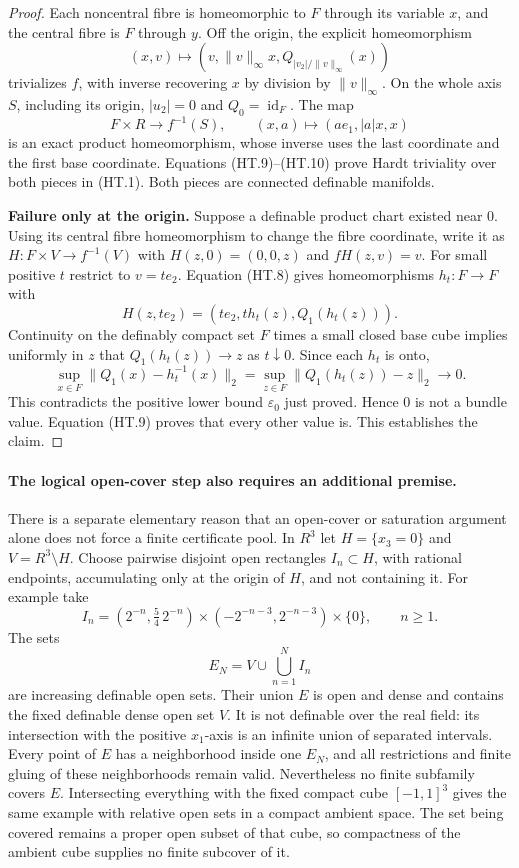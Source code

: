 \begin{proof}
Each noncentral fibre is homeomorphic to $F$ through its variable $x$,
and the central fibre is $F$ through $y$. Off the origin, the explicit
homeomorphism
\[
 (x,v)\longmapsto(v,\|v\|_\infty x,Q_{|v_2|/\|v\|_\infty}(x))
\tag{HT.9}
\]
trivializes $f$, with inverse recovering $x$ by division by
$\|v\|_\infty$. On the whole axis $S$, including its origin,
$|u_2|=0$ and $Q_0=\operatorname{id}_F$. The map
\[
 F\times R\longrightarrow f^{-1}(S),\qquad
 (x,a)\longmapsto(ae_1,|a|x,x)
\tag{HT.10}
\]
is an exact product homeomorphism, whose inverse uses the last
coordinate and the first base coordinate. Equations (HT.9)--(HT.10)
prove Hardt triviality over both pieces in (HT.1). Both pieces are
connected definable manifolds.

\textbf{Failure only at the origin.}\quad
Suppose a definable product chart existed near $0$. Using its central
fibre homeomorphism to change the fibre coordinate, write it as
$H:F\times V\to f^{-1}(V)$ with
$H(z,0)=(0,0,z)$ and $fH(z,v)=v$. For small positive $t$ restrict
to $v=te_2$. Equation (HT.8) gives homeomorphisms $h_t:F\to F$
with
\[
 H(z,te_2)=(te_2,t h_t(z),Q_1(h_t(z))).
\tag{HT.11}
\]
Continuity on the definably compact set $F$ times a small closed base
cube implies uniformly in $z$ that
$Q_1(h_t(z))\to z$ as $t\downarrow0$. Since each $h_t$ is onto,
\[
 \sup_{x\in F}\|Q_1(x)-h_t^{-1}(x)\|_2
 =\sup_{z\in F}\|Q_1(h_t(z))-z\|_2\longrightarrow0.
\tag{HT.12}
\]
This contradicts the positive lower bound $\varepsilon_0$ just
proved. Hence $0$ is not a bundle value. Equation (HT.9) proves
that every other value is. This establishes the claim.
\end{proof}

\paragraph{The logical open-cover step also requires an additional premise.}
There is a separate elementary reason that an open-cover or saturation
argument alone does not force a finite certificate pool. In $R^3$ let
$H=\{x_3=0\}$ and $V=R^3\setminus H$. Choose pairwise disjoint
open rectangles $I_n\subset H$, with rational endpoints, accumulating
only at the origin of $H$, and not containing it. For example take
\[
 I_n=(2^{-n},\tfrac54\,2^{-n})\times
                    (-2^{-n-3},2^{-n-3})\times\{0\},\qquad n\ge1.
\]
The sets
\[
 E_N=V\cup\bigcup_{n=1}^N I_n
\]
are increasing definable open sets. Their union $E$ is open and dense
and contains the fixed definable dense open set $V$. It is not
definable over the real field: its intersection with the positive
$x_1$-axis is an infinite union of separated intervals. Every point
of $E$ has a neighborhood inside one $E_N$, and all restrictions and
finite gluing of these neighborhoods remain valid. Nevertheless no
finite subfamily covers $E$.
Intersecting everything with the fixed compact cube $[-1,1]^3$ gives
the same example with relative open sets in a compact ambient space.
The set being covered remains a proper open subset of that cube, so
compactness of the ambient cube supplies no finite subcover of it.

